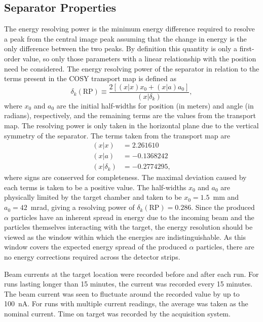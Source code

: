 \subsection{Separator Properties}

The energy resolving power is the minimum energy difference required to
resolve a peak from the central image peak assuming that the change in
energy is the only difference between the two peaks. By definition this
quantity is only a first-order value, so only those parameters with a
linear relationship with the position need be considered. The energy
resolving power of the separator in relation to the terms present in the
COSY transport map is defined as
\begin{equation}
    \delta_k(\textrm{RP}) \equiv
        \frac{2\left[(x|x)x_0 + (x|a)a_0\right]}{(x|\delta_k)},
\end{equation}
where $x_0$ and $a_0$ are the initial half-widths for position (in
meters) and angle (in radians), respectively, and the remaining terms
are the values from the transport map. The resolving power is only taken
in the horizontal plane due to the vertical symmetry of the separator.
The terms taken from the transport map are
\begin{align*}
    (x|x) &= 2.261610 \\
    (x|a) &= {-0.1368242} \\
    (x|\delta_k) &= {-0.2774295},
\end{align*}
where signs are conserved for completeness. The maximal deviation caused
by each terms is taken to be a positive value. The half-widths $x_0$ and
$a_0$ are physically limited by the target chamber and taken to be $x_0
= 1.5$~mm and $a_0 = 42$~mrad, giving a resolving power of
$\delta_k(\textrm{RP}) = 0.286$. Since the produced $\alpha$ particles
have an inherent spread in energy due to the incoming beam and the
particles themselves interacting with the target, the energy resolution
should be viewed as the window within which the energies are
indistinguishable. As this window covers the expected energy spread of
the produced $\alpha$ particles, there are no energy corrections
required across the detector strips.

Beam currents at the target location were recorded before and after each
run. For runs lasting longer than 15 minutes, the current was recorded
every 15 minutes. The beam current was seen to fluctuate around the
recorded value by up to 100~nA. For runs with multiple current readings,
the average was taken as the nominal current. Time on target was
recorded by the acquisition system.

